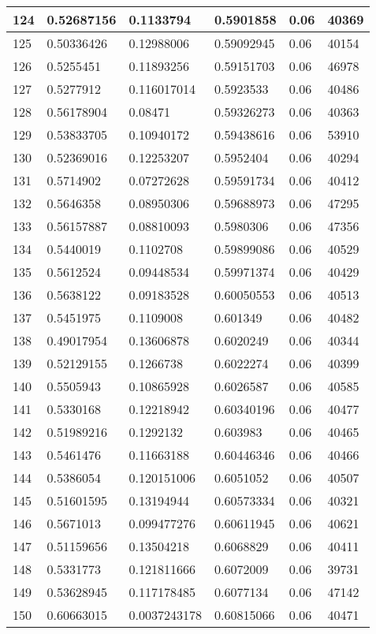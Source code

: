 \begin{longtable}{|l|l|l|l|l|l|}
124 & 0.52687156 & 0.1133794 & 0.5901858 & 0.06 & 40369 \\ \hline 
125 & 0.50336426 & 0.12988006 & 0.59092945 & 0.06 & 40154 \\ \hline 
126 & 0.5255451 & 0.11893256 & 0.59151703 & 0.06 & 46978 \\ \hline 
127 & 0.5277912 & 0.116017014 & 0.5923533 & 0.06 & 40486 \\ \hline 
128 & 0.56178904 & 0.08471 & 0.59326273 & 0.06 & 40363 \\ \hline 
129 & 0.53833705 & 0.10940172 & 0.59438616 & 0.06 & 53910 \\ \hline 
130 & 0.52369016 & 0.12253207 & 0.5952404 & 0.06 & 40294 \\ \hline 
131 & 0.5714902 & 0.07272628 & 0.59591734 & 0.06 & 40412 \\ \hline 
132 & 0.5646358 & 0.08950306 & 0.59688973 & 0.06 & 47295 \\ \hline 
133 & 0.56157887 & 0.08810093 & 0.5980306 & 0.06 & 47356 \\ \hline 
134 & 0.5440019 & 0.1102708 & 0.59899086 & 0.06 & 40529 \\ \hline 
135 & 0.5612524 & 0.09448534 & 0.59971374 & 0.06 & 40429 \\ \hline 
136 & 0.5638122 & 0.09183528 & 0.60050553 & 0.06 & 40513 \\ \hline 
137 & 0.5451975 & 0.1109008 & 0.601349 & 0.06 & 40482 \\ \hline 
138 & 0.49017954 & 0.13606878 & 0.6020249 & 0.06 & 40344 \\ \hline 
139 & 0.52129155 & 0.1266738 & 0.6022274 & 0.06 & 40399 \\ \hline 
140 & 0.5505943 & 0.10865928 & 0.6026587 & 0.06 & 40585 \\ \hline 
141 & 0.5330168 & 0.12218942 & 0.60340196 & 0.06 & 40477 \\ \hline 
142 & 0.51989216 & 0.1292132 & 0.603983 & 0.06 & 40465 \\ \hline 
143 & 0.5461476 & 0.11663188 & 0.60446346 & 0.06 & 40466 \\ \hline 
144 & 0.5386054 & 0.120151006 & 0.6051052 & 0.06 & 40507 \\ \hline 
145 & 0.51601595 & 0.13194944 & 0.60573334 & 0.06 & 40321 \\ \hline 
146 & 0.5671013 & 0.099477276 & 0.60611945 & 0.06 & 40621 \\ \hline 
147 & 0.51159656 & 0.13504218 & 0.6068829 & 0.06 & 40411 \\ \hline 
148 & 0.5331773 & 0.121811666 & 0.6072009 & 0.06 & 39731 \\ \hline 
149 & 0.53628945 & 0.117178485 & 0.6077134 & 0.06 & 47142 \\ \hline 
150 & 0.60663015 & 0.0037243178 & 0.60815066 & 0.06 & 40471 \\ \hline 
\end{longtable}